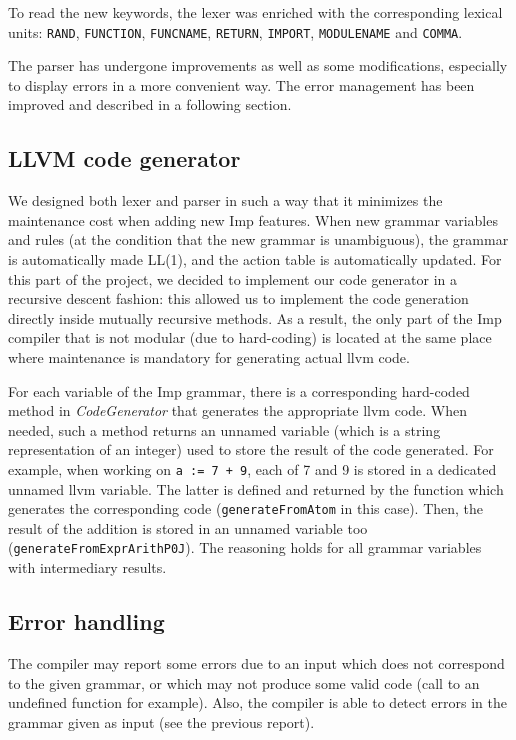 \documentclass[11pt]{article}
\begin{document}
To read the new keywords, the lexer was enriched with the corresponding lexical units: \texttt{RAND}, \texttt{FUNCTION},
\texttt{FUNCNAME}, \texttt{RETURN}, \texttt{IMPORT}, \texttt{MODULENAME} and \texttt{COMMA}.

The parser has undergone improvements as well as some modifications, especially to display errors in a more
convenient way. The error management has been improved and described in a following section.

\subsection{LLVM code generator}

We designed both lexer and parser in such a way that it minimizes the maintenance cost when adding new Imp features.
When new grammar variables and rules (at the condition that the new grammar is unambiguous), the grammar is automatically
made LL(1), and the action table is automatically updated. For this part of the project, we decided to implement
our code generator in a recursive descent fashion: this allowed us to implement the code generation directly inside
mutually recursive methods. As a result, the only part of the Imp compiler that is not modular (due to hard-coding)
is located at the same place where maintenance is mandatory for generating actual llvm code.

For each variable of the Imp grammar, there is a corresponding hard-coded method in \textit{CodeGenerator} that
generates the appropriate llvm code.
When needed, such a method returns an unnamed variable (which is a string representation of an integer) 
used to store the result of the code generated.
For example, when working on \texttt{a := 7 + 9}, each of 7 and 9 is stored in a dedicated unnamed llvm variable. 
The latter is defined and returned by the function which generates the corresponding code (\texttt{generateFromAtom} in this case).
Then, the result of the addition is stored in an unnamed variable too (\texttt{generateFromExprArithP0J}).
The reasoning holds for all grammar variables with intermediary results.



\subsection{Error handling}

The compiler may report some errors due to an input which does not correspond to the given grammar, or which may not
produce some valid code (call to an undefined function for example).
Also, the compiler is able to detect errors in the grammar given as input (see the previous report).
\end{document}
